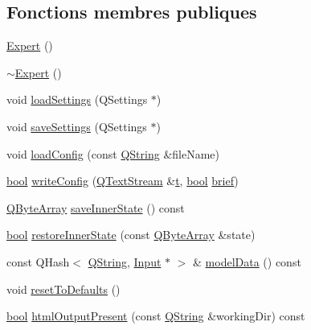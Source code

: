 \subsection*{Fonctions membres publiques}
\begin{DoxyCompactItemize}
\item 
\hyperlink{class_expert_a78d4a5457ab31eae8b3b95127182611e}{Expert} ()
\item 
\hyperlink{class_expert_a28973ff9eae010720a10ec88a3d1bb15}{$\sim$\+Expert} ()
\item 
void \hyperlink{class_expert_a6699bfc81c493bb4f7ac8985ae57a9cc}{load\+Settings} (Q\+Settings $\ast$)
\item 
void \hyperlink{class_expert_ac7bcc765c191acd4e2af1560115cb70a}{save\+Settings} (Q\+Settings $\ast$)
\item 
void \hyperlink{class_expert_a072a019d46bd7a9b4eb92fb0ca86b5b7}{load\+Config} (const \hyperlink{class_q_string}{Q\+String} \&file\+Name)
\item 
\hyperlink{qglobal_8h_a1062901a7428fdd9c7f180f5e01ea056}{bool} \hyperlink{class_expert_a4bc35e5cb24bb095511bd8cdc7f415b7}{write\+Config} (\hyperlink{class_q_text_stream}{Q\+Text\+Stream} \&\hyperlink{058__bracket__recursion_8tcl_a69e959f6901827e4d8271aeaa5fba0fc}{t}, \hyperlink{qglobal_8h_a1062901a7428fdd9c7f180f5e01ea056}{bool} \hyperlink{vhdljjparser_8cpp_a523a0a657a0db3a8f2ffe3d21a9f1289}{brief})
\item 
\hyperlink{qcstring_8h_ad6a390648110655c217fe072d45fbcf5}{Q\+Byte\+Array} \hyperlink{class_expert_a46628c8a4eedc98feb3de57cdb689467}{save\+Inner\+State} () const 
\item 
\hyperlink{qglobal_8h_a1062901a7428fdd9c7f180f5e01ea056}{bool} \hyperlink{class_expert_acfcc32d46839257f85dd9fd0e346b62d}{restore\+Inner\+State} (const \hyperlink{qcstring_8h_ad6a390648110655c217fe072d45fbcf5}{Q\+Byte\+Array} \&state)
\item 
const Q\+Hash$<$ \hyperlink{class_q_string}{Q\+String}, \hyperlink{class_input}{Input} $\ast$ $>$ \& \hyperlink{class_expert_a450f29476ad7ffcc6f19fb13ced3934b}{model\+Data} () const 
\item 
void \hyperlink{class_expert_a7c5287712acfe6451563bdc7f17e9ef6}{reset\+To\+Defaults} ()
\item 
\hyperlink{qglobal_8h_a1062901a7428fdd9c7f180f5e01ea056}{bool} \hyperlink{class_expert_a93b40c0ee9a0d5a3805076b2209203e9}{html\+Output\+Present} (const \hyperlink{class_q_string}{Q\+String} \&working\+Dir) const 
\item 

\end{DoxyCompactItemize}
